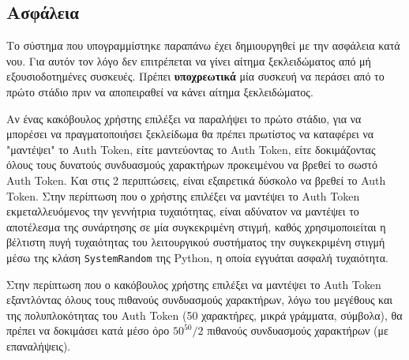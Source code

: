 	\subsection{Ασφάλεια}
		Το σύστημα που υπογραμμίστηκε παραπάνω έχει δημιουργηθεί με την ασφάλεια κατά νου. Για αυτόν τον λόγο δεν επιτρέπεται να γίνει αίτημα ξεκλειδώματος από μή εξουσιοδοτημένες συσκευές. Πρέπει \textbf{υποχρεωτικά} μία συσκευή να περάσει από το πρώτο στάδιο πριν να αποπειραθεί να κάνει αίτημα ξεκλειδώματος.

		Αν ένας κακόβουλος χρήστης επιλέξει να παραλήψει το πρώτο στάδιο, για να μπορέσει να πραγματοποιήσει ξεκλείδωμα θα πρέπει πρωτίστος να καταφέρει να "μαντέψει" το Auth Token, είτε μαντεύοντας το Auth Token, είτε δοκιμάζοντας όλους τους δυνατούς συνδυασμούς χαρακτήρων προκειμένου να βρεθεί το σωστό Auth Token. Και στις 2 περιπτώσεις, είναι εξαιρετικά δύσκολο να βρεθεί το Auth Token. Στην περίπτωση που ο χρήστης επιλέξει να μαντέψει το Auth Token εκμεταλλευόμενος την γεννήτρια τυχαιότητας, είναι αδύνατον να μαντέψει το αποτέλεσμα της συνάρτησης σε μία συγκεκριμένη στιγμή, καθός χρησιμοποιείται η βέλτιστη πυγή τυχαιότητας του λειτουργικού συστήματος την συγκεκριμένη στιγμή μέσω της κλάση \verb|SystemRandom| της Python, η οποία εγγυάται ασφαλή τυχαιότητα. 

		Στην περίπτωση που ο κακόβουλος χρήστης επιλέξει να μαντέψει το Auth Token εξαντλόντας όλους τους πιθανούς συνδυασμούς χαρακτήρων, λόγω του μεγέθους και της πολυπλοκότητας του Auth Token (50 χαρακτήρες, μικρά γράμματα, σύμβολα), θα πρέπει να δοκιμάσει κατά μέσο όρο \(50^{50}/2\) πιθανούς συνδυασμούς χαρακτήρων (με επαναλήψεις). 